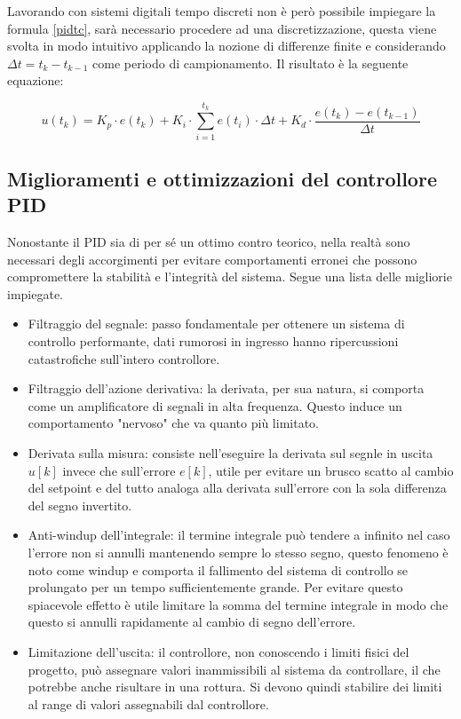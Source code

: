 \documentclass[11pt]{article}
\begin{document}
Lavorando con sistemi digitali tempo discreti non è però possibile impiegare la formula \eqref{pidtc}, sarà necessario procedere ad una discretizzazione, questa viene svolta in modo intuitivo applicando la nozione di differenze finite e considerando $\Delta t = t_k - t_{k-1}$ come periodo di campionamento. Il risultato è la seguente equazione:

\begin{equation}\label{pidtd}
    u(t_k)=K_p \cdot e(t_k) + K_i \cdot \sum_{i=1}^{t_k} e(t_i)\cdot \Delta t + K_d\cdot \frac{e(t_k)-e(t_{k-1})}{\Delta t}
\end{equation}



\subsection{Miglioramenti e ottimizzazioni del controllore PID}
Nonostante il PID sia di per sé un ottimo contro teorico, nella realtà sono necessari degli accorgimenti per evitare comportamenti erronei che possono compromettere la stabilità e l'integrità del sistema. Segue una lista delle migliorie impiegate.
\begin{itemize}
\item Filtraggio del segnale: passo fondamentale per ottenere un sistema di controllo performante, dati rumorosi in ingresso hanno ripercussioni catastrofiche sull'intero controllore.
\item Filtraggio dell'azione derivativa: la derivata, per sua natura, si comporta come un amplificatore di segnali in alta frequenza. Questo induce un comportamento "nervoso" che va quanto più limitato. 
\item Derivata sulla misura: consiste nell'eseguire la derivata sul segnle in uscita $u[k]$ invece che sull'errore $e[k]$, utile per evitare un brusco scatto al cambio del setpoint e del tutto analoga alla derivata sull'errore con la sola differenza del segno invertito.
\item Anti-windup dell'integrale: il termine integrale può tendere a infinito nel caso l'errore non si annulli mantenendo sempre lo stesso segno, questo fenomeno è noto come windup e comporta il fallimento del sistema di controllo se prolungato per un tempo sufficientemente grande. Per evitare questo spiacevole effetto è utile limitare la somma del termine integrale in modo che questo si annulli rapidamente al cambio di segno dell'errore.
\item Limitazione dell'uscita: il controllore, non conoscendo i limiti fisici del progetto, può assegnare valori inammissibili al sistema da controllare, il che potrebbe anche risultare in una rottura. Si devono quindi stabilire dei limiti al range di valori assegnabili dal controllore.
\end{itemize}
\end{document}
